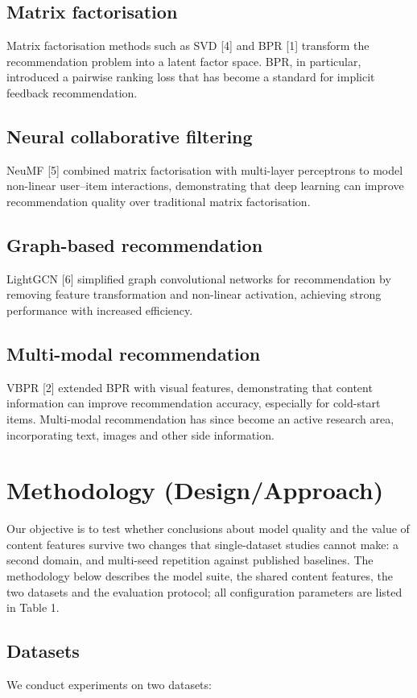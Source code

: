 \documentclass[11pt,a4paper]{article}
\begin{document}
\subsection{Matrix factorisation}
Matrix factorisation methods such as SVD [4] and BPR [1] transform the
recommendation problem into a latent factor space. BPR, in particular,
introduced a pairwise ranking loss that has become a standard for implicit
feedback recommendation.

\subsection{Neural collaborative filtering}
NeuMF [5] combined matrix factorisation with multi-layer perceptrons to model
non-linear user--item interactions, demonstrating that deep learning can improve
recommendation quality over traditional matrix factorisation.

\subsection{Graph-based recommendation}
LightGCN [6] simplified graph convolutional networks for recommendation by
removing feature transformation and non-linear activation, achieving strong
performance with increased efficiency.

\subsection{Multi-modal recommendation}
VBPR [2] extended BPR with visual features, demonstrating that content
information can improve recommendation accuracy, especially for cold-start
items. Multi-modal recommendation has since become an active research area,
incorporating text, images and other side information.

\section{Methodology (Design/Approach)}
Our objective is to test whether conclusions about model quality and the value
of content features survive two changes that single-dataset studies cannot make:
a second domain, and multi-seed repetition against published baselines. The
methodology below describes the model suite, the shared content features, the
two datasets and the evaluation protocol; all configuration parameters are
listed in Table 1.

\subsection{Datasets}
We conduct experiments on two datasets:
\end{document}
